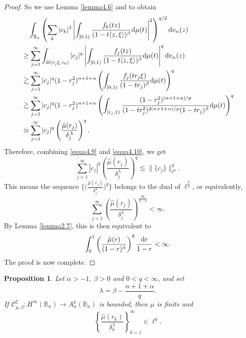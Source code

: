 \documentclass[preprint,12pt,times]{elsarticle}
\newtheorem{proposition}[theorem]{Proposition}
\theoremstyle{definition}
\theoremstyle{remark}
\numberwithin{equation}{section}
\begin{document}
\begin{proof}
So we use Lemma \ref{lemma4.6} and \cite[Theorem 2.1]{Zhu2005} to obtain
\begin{equation}\label{equa4.10}
\begin{split}
&\quad \int_{\mathbb{B}_n}\left(\sum_{k}|c_k|^2\left|\int_{[0,1)}\frac{f_k(tz)}{(1-t\langle z,\xi\rangle)^{\beta}}{\rm d}\mu(t)\right|^2\right)^{q/2}{\rm d}v_{\alpha}(z)\\
&\geq \sum_{j=1}^{\infty}\int_{B(r_j\xi,\tau_0)}|c_j|^q\left|\int_{[0,1)}\frac{f_j(tz)}{(1-t\langle z,\xi\rangle)^{\beta}}{\rm d}\mu(t)\right|^q{\rm d}v_{\alpha}(z)\\
&\gtrsim \sum_{j=1}^{\infty}|c_j|^q(1-r_j^2)^{n+1+\alpha}\left(\int_{[0,1)}\frac{f_j(t r_j\xi)}{(1-t r_j)^{\beta}}{\rm d}\mu(t)\right)^q\\
&\gtrsim \sum_{j=1}^{\infty}|c_j|^q(1-r_j^2)^{n+1+\alpha}\left(\int_{[r_j,1)}\frac{(1-r_j^2)^{(n+1+\alpha)/p}}{(1-t r_j^2)^{2(n+1+\alpha)/p}(1-t r_j)^{\beta}}{\rm d}\mu(t)\right)^q\\
&\simeq \sum_{j=1}^{\infty}|c_j|^q\left(\frac{\hat{\mu}(r_j)}{\delta_j^{\,\lambda}}\right)^q.
\end{split}
\end{equation}
Therefore, combining \eqref{equa4.9} and \eqref{equa4.10}, we get
\begin{equation*}
\sum_{j=1}^{\infty}|c_j|^q\left(\frac{\hat{\mu}(r_j)}{\delta_j^{\lambda}}\right)^q\lesssim \|\{c_j\}\|_{\ell^p}^q.
\end{equation*}
This means the sequence $\big\{\big(\frac{\hat{\mu}(r_j)}{\delta_j^{\lambda}}\big)^q\big\}$ belongs to the dual of $\ell^{\frac{p}{q}}$, or equivalently,
\begin{equation*}
\sum_{j=1}^{\infty}\left(\frac{\hat{\mu}(r_j)}{\delta_j^{\lambda}}\right)^{\frac{pq}{p-q}}<\infty.
\end{equation*}
By Lemma \ref{lemma2.7}, this is then equivalent to
\begin{equation*}
\int_{0}^1\left(\frac{\hat{\mu}(r)}{(1-r)^{\lambda}}\right)^{\theta}\frac{{\rm d}r}{1-r}<\infty.
\end{equation*}
The proof is now complete.
\end{proof}


{
\begin{proposition}\label{proposition4.8}
Let $\alpha>-1$, $\beta>0$ and $0<q<\infty$, and set
\[
    \lambda=\beta-\frac{n+1+\alpha}{q}.
\]
If $\mathcal{C}_{\mu,\beta}^{\xi}:H^{\infty}(\mathbb{B}_n)\to A_{\alpha}^q(\mathbb{B}_n)$ is bounded, then $\mu$ is finite and
\[
    \left\{\frac{\hat{\mu}(r_k)}{\delta_k^{\lambda}}\right\}_{k=1}^{\infty}\in\ell^q.
\]
\end{proposition}
}
\end{document}
